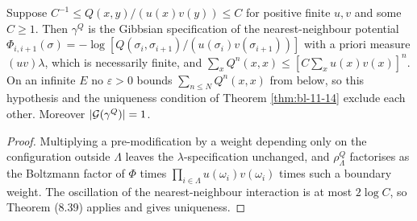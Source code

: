 \begin{remark}[Georgii (11.18)(2)]
    \label{rmk:bl-11-18-2}
    \leanok

    Suppose $C^{-1} \leq Q(x,y)/(u(x)v(y)) \leq C$ for positive finite $u, v$ and some
    $C \geq 1$. Then $\gamma^Q$ is the Gibbsian specification of the nearest-neighbour potential
    $\Phi_{i,i+1}(\sigma) = -\log[Q(\sigma_i,\sigma_{i+1})/(u(\sigma_i)v(\sigma_{i+1}))]$ with
    a priori measure $(uv)\lambda$, which is necessarily finite, and
    $\sum_x Q^{n}(x,x) \leq [C\sum_x u(x)v(x)]^{n}$. On an infinite $E$ no $\varepsilon > 0$
    bounds $\sum_{n \leq N} Q^n(x,x)$ from below, so this hypothesis and the uniqueness
    condition of Theorem \ref{thm:bl-11-14} exclude each other. Moreover
    $\lvert \mathcal G(\gamma^Q)\rvert = 1$.
\end{remark}
\begin{proof}
    \leanok
    Multiplying a pre-modification by a weight depending only on the configuration outside
    $\Lambda$ leaves the $\lambda$-specification unchanged, and $\rho^Q_\Lambda$ factorises as
    the Boltzmann factor of $\Phi$ times $\prod_{i \in \Lambda} u(\omega_i)v(\omega_i)$ times
    such a boundary weight. The oscillation of the nearest-neighbour interaction is at most
    $2\log C$, so Theorem (8.39) applies and gives uniqueness.
\end{proof}

